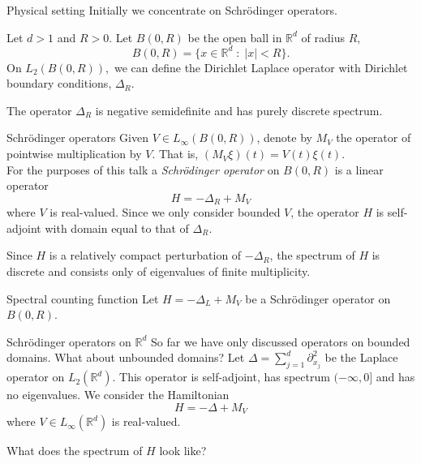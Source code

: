 \documentclass{beamer}
\numberwithin{equation}{section}
\theoremstyle{plain}
\theoremstyle{plain}
\theoremstyle{definition}
\theoremstyle{plain}
\theoremstyle{plain}
\theoremstyle{definition}
\newcommand{\Rl}{\mathbb{R}}
\begin{document}
\begin{frame}{Physical setting}
    Initially we concentrate on Schr\"odinger operators.

    Let $d > 1$ and $R > 0$. Let $B(0,R)$ be the open ball in $\Rl^d$ of radius $R,$
    \begin{equation*}
        B(0,R) = \{x\in \Rl^d\;:\;|x|<R\}.
    \end{equation*}
    \pause
    On $L_2(B(0,R)),$ we can define the Dirichlet Laplace operator with Dirichlet boundary conditions, $\Delta_R.$
    \pause
    
    The operator $\Delta_R$ is negative semidefinite and has purely discrete spectrum.
\end{frame}

\begin{frame}{Schr\"odinger operators}
    Given $V \in L_\infty(B(0,R))$, denote by $M_V$ the operator of pointwise multiplication by $V$. That is, $(M_V\xi)(t) = V(t)\xi(t)$. \pause \\
    For the purposes of this talk a \emph{Schr\"odinger operator} on $B(0,R)$ is a linear operator
    $$
        H = -\Delta_R+M_V
    $$
    where $V$ is real-valued. Since we only consider bounded $V$, the operator $H$ is self-adjoint with domain equal to that of $\Delta_R$.\pause
    
    Since $H$ is a relatively compact
    perturbation of $-\Delta_R$, the spectrum of $H$ is discrete and consists only of eigenvalues of finite multiplicity. 
\end{frame}

\begin{frame}{Spectral counting function}
    Let $H  =-\Delta_L+M_V$ be a Schr\"odinger operator on $B(0,R)$.
\end{frame}

\begin{frame}{Schr\"odinger operators on $\Rl^d$}
    So far we have only discussed operators on bounded domains. What about unbounded domains?
    Let $\Delta = \sum_{j=1}^d \partial_{x_j}^2$ be the Laplace operator on $L_2(\Rl^d)$. This operator is self-adjoint,
    has spectrum $(-\infty,0]$ and has no eigenvalues. We consider the Hamiltonian 
    $$
        H = -\Delta+M_V
    $$
    where $V \in L_\infty(\Rl^d)$ is real-valued.
    
    What does the spectrum of $H$ look like?
\end{frame}
\end{document}
